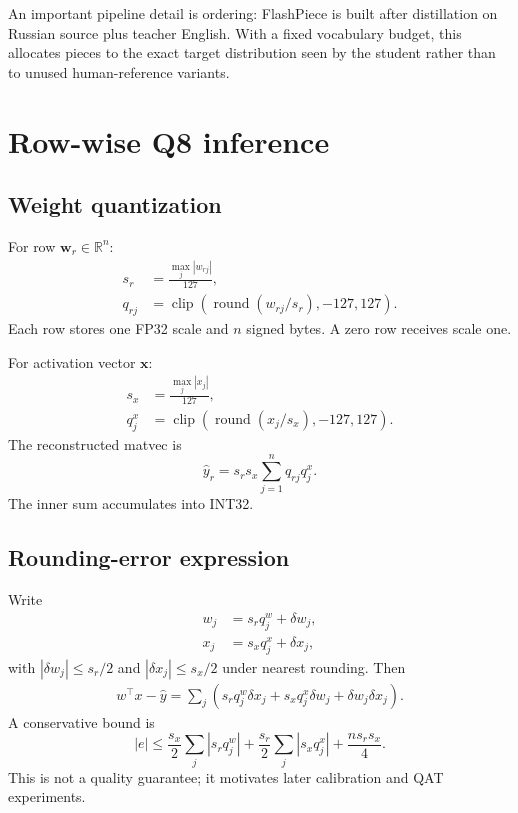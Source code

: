 \documentclass{article}
\newcommand{\R}{\mathbb{R}}
\begin{document}
An important pipeline detail is ordering: FlashPiece is built after distillation on Russian source plus teacher English. With a fixed vocabulary budget, this allocates pieces to the exact target distribution seen by the student rather than to unused human-reference variants.

\section{Row-wise Q8 inference}
\subsection{Weight quantization}
For row $\mathbf{w}_r\in\R^n$:
\begin{align}
s_r&=\frac{\max_j|w_{rj}|}{127},\\
q_{rj}&=\operatorname{clip}
\left(\operatorname{round}(w_{rj}/s_r),-127,127\right).
\end{align}
Each row stores one FP32 scale and $n$ signed bytes. A zero row receives scale one.

For activation vector $\mathbf{x}$:
\begin{align}
s_x&=\frac{\max_j|x_j|}{127},\\
q^x_j&=\operatorname{clip}
\left(\operatorname{round}(x_j/s_x),-127,127\right).
\end{align}
The reconstructed matvec is
\begin{equation}
\hat y_r=s_rs_x\sum_{j=1}^{n}q_{rj}q^x_j.
\label{eq:q8}
\end{equation}
The inner sum accumulates into INT32.

\subsection{Rounding-error expression}
Write
\begin{align}
w_j&=s_rq^w_j+\delta w_j,\\
x_j&=s_xq^x_j+\delta x_j,
\end{align}
with $|\delta w_j|\le s_r/2$ and $|\delta x_j|\le s_x/2$ under nearest rounding. Then
\begin{align}
w^\top x-\hat y
=\sum_j(
s_rq^w_j\delta x_j
+s_xq^x_j\delta w_j
+\delta w_j\delta x_j).
\end{align}
A conservative bound is
\begin{equation}
|e|\le
\frac{s_x}{2}\sum_j|s_rq^w_j|
+\frac{s_r}{2}\sum_j|s_xq^x_j|
+\frac{ns_rs_x}{4}.
\end{equation}
This is not a quality guarantee; it motivates later calibration and QAT experiments.
\end{document}
